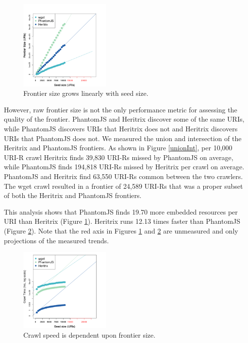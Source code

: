 \documentclass{ipres_proc_article-sp}
\begin{document}
\begin{figure}
 \begin{center}
    \includegraphics[width=0.4\textwidth,keepaspectratio]{./imgs/predictGrowthFunction2.png}
  \end{center}
  \caption{Frontier size grows linearly with seed size.}
  \label{frontierGrowth}
\end{figure}

However, raw frontier size is not the only performance metric for assessing the quality of the frontier. PhantomJS and Heritrix discover some of the same URIs, while PhantomJS discovers URIs that Heritrix does not and Heritrix discovers URIs that PhantomJS does not. We measured the union and intersection of the Heritrix and PhantomJS frontiers. As shown in Figure \ref{unionInt}, per 10,000 URI-R crawl Heritrix finds 39,830 URI-Rs missed by PhantomJS on average, while PhantomJS finds 194,818 URI-Rs missed by Heritrix per crawl on average. PhantomJS and Heritrix find 63,550 URI-Rs common between the two crawlers. The wget crawl resulted in a frontier of 24,589 URI-Rs that was a proper subset of both the Heritrix and PhantomJS frontiers.


This analysis shows that PhantomJS finds 19.70 more embedded resources per URI than Heritrix (Figure \ref{frontierGrowth}). Heritrix runs 12.13 times faster than PhantomJS (Figure \ref{speedGrowth}). Note that the red axis in Figures \ref{frontierGrowth} and \ref{speedGrowth} are unmeasured and only projections of the measured trends.%


\begin{figure}[t]
 \begin{center}
    \includegraphics[width=0.4\textwidth,keepaspectratio]{./imgs/predictGrowthFunctionTime2.png}
  \end{center}
  \caption{Crawl speed is dependent upon frontier size.}
  \label{speedGrowth}
\end{figure}
\vskip -3mm
\end{document}
